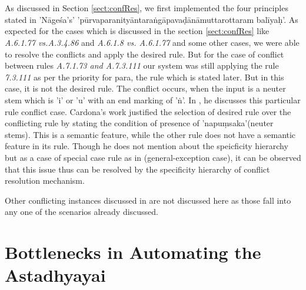 \documentclass[a4paper,11pt,twoside,openright]{report}
\begin{document}
\\ \\
As discussed in Section \ref{sect:confRes}, we first implemented the four principles stated in 	'Nāgeśa's' 'pūrvaparanityāntaraṅgāpavaḍānāmuttarottaram balīyaḥ'. As expected for the cases which is discussed in the section \ref{sect:confRes} like \textsl{ A.6.1.77 vs.\sl A.3.4.86}
 and \textsl{ A.6.1.8 vs. A.6.1.77} and some other cases, we were able to resolve the conflicts and apply the desired rule. But for the case of conflict between rules \textsl{ A.7.1.73 and A.7.3.111} our system was still applying the rule \textsl{ 7.3.111} as per the priority for para, the rule which is stated later. But in this case, it is not the desired rule. The conflict occurs, when the input is a neuter stem which is 'i' or 'u' with an end marking of 'ṅ'. In , he discusses this particular rule conflict case. Cardona's work justified the selection of desired rule over the conflicting rule by stating the condition of presence of 'napuṃsaka'(neuter stems). This is a semantic feature, while the other rule does not have a semantic feature in its rule. Though he does not mention about the speicficity hierarchy but as a case of special case rule as in (general-exception case), it can be observed that this issue thus can be resolved by the specificity hierarchy of conflict resolution mechanism. 


Other conflicting instances discussed in  are not discussed here as those fall into any one of the scenarios already discussed.

\section{Bottlenecks in Automating the Astadhyayai}
\label{bottlenecks}
\end{document}
